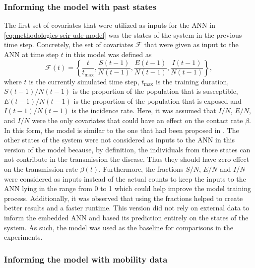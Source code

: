 \subsubsection{Informing the model with past states}
The first set of covariates that were utilized as inputs for the \gls{ANN} in \autoref{eq:methodologies-seir-ude-model} was the states of the system in the previous time step.
Concretely, the set of covariates $\mathcal{F}$ that were given as input to the \gls{ANN} at time step $t$ in this model was defined as
\begin{equation}
    \mathcal{F}(t) = \left\lbrace \frac{t}{t_\text{max}}, \frac{S(t-1)}{N(t-1)}, \frac{E(t-1)}{N(t-1)}, \frac{I(t-1)}{N(t-1)} \right\rbrace,
\end{equation}
where $t$ is the currently simulated time step, $t_\text{max}$ is the training duration, $S(t-1)/N(t-1)$ is the proportion of the population that is susceptible, $E(t-1)/N(t-1)$ is the proportion of the population that is exposed and $I(t-1)/N(t-1)$ is the incidence rate.
Here, it was assumed that $I/N$, $E/N$, and $I/N$ were the only covariates that could have an effect on the contact rate $\beta$.
In this form, the model is similar to the one that had been proposed in \cite{dandekarMachineLearningAidedGlobal2020a}.
The other states of the system were not considered as inputs to the \gls{ANN} in this version of the model because, by definition, the individuals from those states can not contribute in the transmission the disease.
Thus they should have zero effect on the transmission rate $\beta(t)$.
Furthermore, the fractions $S/N$, $E/N$ and $I/N$ were considered as inputs instead of the actual counts to keep the inputs to the \gls{ANN} lying in the range from 0 to 1 which could help improve the model training process.
Additionally, it was observed that using the fractions helped to create better results and a faster runtime.
This version did not rely on external data to inform the embedded \gls{ANN} and based its prediction entirely on the states of the system.
As such, the model was used as the baseline for comparisons in the experiments.

\subsubsection{Informing the model with mobility data}

